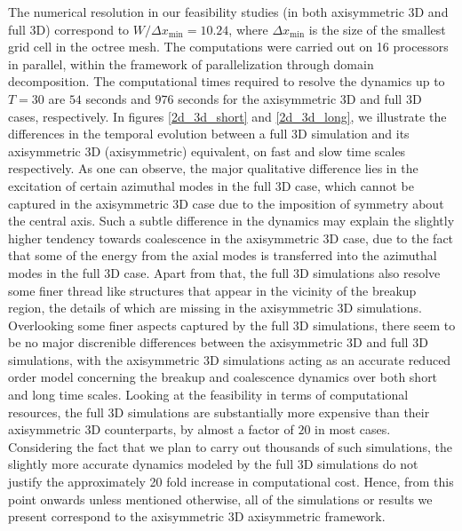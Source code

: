 The numerical resolution in our feasibility studies (in both axisymmetric 3D and full 3D) correspond to 
$W / \Delta x_{\textrm{min}} = 10.24$, where $\Delta x_{\textrm{min}}$ is the size 
of the smallest grid cell in the octree mesh. 
The computations were carried out on 16 processors in parallel, within the framework
of parallelization through domain decomposition.
The computational times required to resolve the dynamics up to $T = 30$ are $54$ seconds 
and $976$ seconds for the axisymmetric 3D and full 3D cases, respectively. 
In figures \ref{2d_3d_short} and \ref{2d_3d_long}, we illustrate the differences 
in the temporal evolution between a full 3D simulation and its axisymmetric 3D (axisymmetric)
equivalent, on fast and slow time scales respectively. 
As one can observe, the major qualitative difference 
lies in the excitation of certain azimuthal modes in the full 3D case, 
which cannot be captured in the axisymmetric 3D case due to the 
imposition of symmetry about the central axis.
Such a subtle difference in the dynamics may 
explain the slightly higher tendency towards coalescence 
in the axisymmetric 3D case, due to the fact that some of the energy from 
the axial modes is transferred into the azimuthal modes in the full 3D case. 
Apart from that, the full 3D simulations also resolve some 
finer thread like structures that appear in the vicinity 
of the breakup region, the details of which are missing in the axisymmetric 3D simulations.  
Overlooking some finer aspects captured by the full 3D simulations,  
there seem to be no major discrenible differences between the axisymmetric 3D and full 3D simulations,
with the axisymmetric 3D simulations acting as an accurate reduced order model concerning the 
breakup and coalescence dynamics over both short and long time scales.
Looking at the feasibility in terms of computational resources, the full 3D simulations 
are substantially more expensive than their axisymmetric 3D counterparts, by almost a factor of $20$ in most cases. 
Considering the fact that we plan to carry out thousands of such simulations, the 
slightly more accurate dynamics modeled by the full 3D simulations do not justify the
approximately 20 fold increase in computational cost.   
Hence, from this point onwards unless mentioned otherwise, all of the 
simulations or results we present correspond to the axisymmetric 3D axisymmetric framework.




